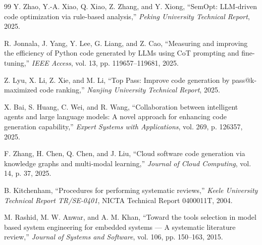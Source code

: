 \documentclass[11pt,a4paper]{article}
\begin{document}
\begin{thebibliography}{99}
Y. Zhao, Y.-A. Xiao, Q. Xiao, Z. Zhang, and Y. Xiong, ``SemOpt: LLM-driven code optimization via rule-based analysis,'' \textit{Peking University Technical Report}, 2025.

R. Jonnala, J. Yang, Y. Lee, G. Liang, and Z. Cao, ``Measuring and improving the efficiency of Python code generated by LLMs using CoT prompting and fine-tuning,'' \textit{IEEE Access}, vol. 13, pp. 119657--119681, 2025.

Z. Lyu, X. Li, Z. Xie, and M. Li, ``Top Pass: Improve code generation by pass@k-maximized code ranking,'' \textit{Nanjing University Technical Report}, 2025.

X. Bai, S. Huang, C. Wei, and R. Wang, ``Collaboration between intelligent agents and large language models: A novel approach for enhancing code generation capability,'' \textit{Expert Systems with Applications}, vol. 269, p. 126357, 2025.

F. Zhang, H. Chen, Q. Chen, and J. Liu, ``Cloud software code generation via knowledge graphs and multi-modal learning,'' \textit{Journal of Cloud Computing}, vol. 14, p. 37, 2025.

B. Kitchenham, ``Procedures for performing systematic reviews,'' \textit{Keele University Technical Report TR/SE-0401}, NICTA Technical Report 0400011T, 2004.

M. Rashid, M. W. Anwar, and A. M. Khan, ``Toward the tools selection in model based system engineering for embedded systems --- A systematic literature review,'' \textit{Journal of Systems and Software}, vol. 106, pp. 150--163, 2015.

\end{thebibliography}
\end{document}
